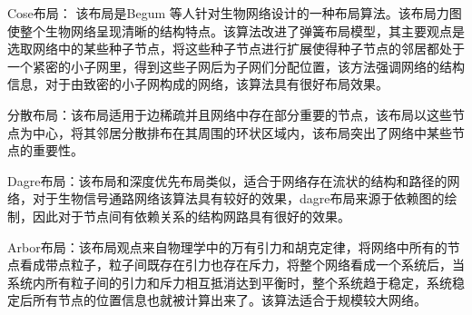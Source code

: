 Cose布局： 该布局是Begum\cite{genc2015algorithm} 等人针对生物网络设计的一种布局算法。该布局力图使整个生物网络呈现清晰的结构特点。该算法改进了弹簧布局\cite{ware2005reevaluating}模型，其主要观点是选取网络中的某些种子节点，将这些种子节点进行扩展使得种子节点的邻居都处于一个紧密的小子网里，得到这些子网后为子网们分配位置，该方法强调网络的结构信息，对于由致密的小子网构成的网络，该算法具有很好布局效果。

分散布局：该布局适用于边稀疏并且网络中存在部分重要的节点，该布局以这些节点为中心，将其邻居分散排布在其周围的环状区域内，该布局突出了网络中某些节点的重要性。

Dagre布局：该布局和深度优先布局类似，适合于网络存在流状的结构和路径的网络，对于生物信号通路网络该算法具有较好的效果，dagre布局来源于依赖图的绘制，因此对于节点间有依赖关系的结构网路具有很好的效果。

Arbor布局：该布局观点来自物理学中的万有引力和胡克定律，将网络中所有的节点看成带点粒子，粒子间既存在引力也存在斥力，将整个网络看成一个系统后，当系统内所有粒子间的引力和斥力相互抵消达到平衡时，整个系统趋于稳定，系统稳定后所有节点的位置信息也就被计算出来了。该算法适合于规模较大网络。


